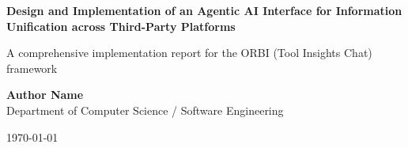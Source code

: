 \documentclass[12pt,a4paper]{article}
\begin{document}
\begin{titlepage}
    \begin{center}
        \vspace*{2cm}
        
        \Huge
        \textbf{Design and Implementation of an Agentic AI Interface for Information Unification across Third-Party Platforms}
        
        \vspace{1.5cm}
        
        \Large
        A comprehensive implementation report for the ORBI (Tool Insights Chat) framework
        
        \vspace{2cm}
        
        \textbf{Author Name} \\ %
        \vspace{0.5cm}
        \large Department of Computer Science / Software Engineering
        
        \vspace{3cm}
        
        \vfill
        
        \large \today
        
    \end{center}
\end{titlepage}

\newpage

\begin{abstract}
\noindent
As enterprise environments increasingly rely on decentralized Software as a Service (SaaS) platforms, workers face significant cognitive friction due to persistent context switching. Traditional information retrieval systems lack the contextual understanding necessary to search and synthesize cross-platform data. In this paper, we present ORBI (Tool Insights Chat), an autonomous, agentic system designed to unify fragmented digital workspaces. By leveraging Large Language Models (LLMs) instructed through function-calling paradigms, ORBI integrates directly with platforms such as Jira, Slack, GitHub, and Google Workspace. Implemented using Next.js, Convex, and the Vercel AI SDK—with Composio orchestrating secure tool execution via OAuth—the proposed architecture demonstrates a highly responsive, real-time query interface. This report outlines the system architecture, discusses the implementation methodology, evaluates observability using Langfuse, and presents the operational results of the system in a simulated enterprise context.
\end{abstract}
\end{document}
